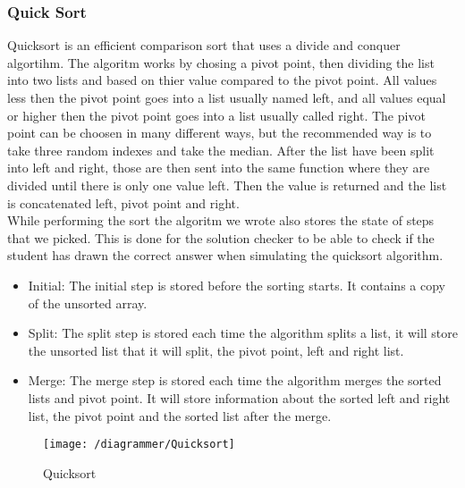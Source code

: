 \subsubsection{Quick Sort}
Quicksort is an efficient comparison sort that uses a divide and conquer algortihm. The algoritm works by chosing a pivot point, then dividing the list into two lists and based on thier value compared to the pivot point. All values less then the pivot point goes into a list usually named left, and all values equal or higher then the pivot point goes into a list usually called right. The pivot point can be choosen in many different ways, but the recommended way is to take three random indexes and take the median. After the list have been split into left and right, those are then sent into the same function where they are divided until there is only one value left. Then the value is returned and the list is concatenated left, pivot point and right.
\\[11pt]
While performing the sort the algoritm we wrote also stores the state of steps that we picked. This is done for the solution checker to be able to check if the student has drawn the correct answer when simulating the quicksort algorithm.
\begin{itemize}
    \item Initial: The initial step is stored before the sorting starts. It contains a copy of the unsorted array.
    \item Split: The split step is stored each time the algorithm splits a list, it will store the unsorted list that it will split, the pivot point, left and right list.
    \item Merge: The merge step is stored each time the algorithm merges the sorted lists and pivot point. It will store information about the sorted left and right list, the pivot point and the sorted list after the merge.
\end{itemize}
\begin{figure}
    \texttt{[image: /diagrammer/Quicksort]}
    \caption{Quicksort}
    \label{fig:quicksort}
\end{figure}